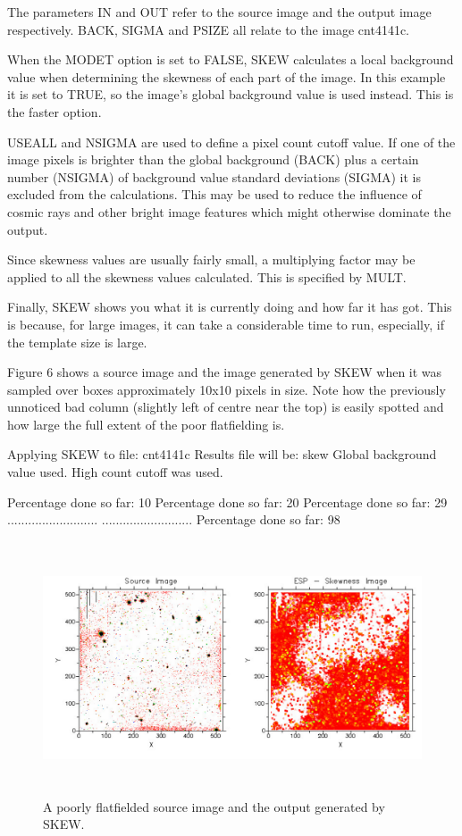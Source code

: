 \documentclass[twoside,11pt]{starlink}
\begin{document}
The parameters IN and OUT refer to the source image and the output image
respectively. BACK, SIGMA and PSIZE all relate to the image
cnt4141c.

When the MODET option is set to FALSE, SKEW calculates a local background
value when determining the skewness of each part of the image. In this
example it is set to TRUE, so the image's global background value is used
instead. This is the faster option.

USEALL and NSIGMA are used to define a pixel count cutoff value. If one of the
image pixels is brighter than the global background (BACK) plus a certain
number (NSIGMA) of background value standard deviations (SIGMA) it is excluded from the
calculations. This may be used to reduce the influence of cosmic rays and
other bright image features which might otherwise dominate the output.

Since skewness values are usually fairly small, a multiplying factor may be
applied to all the skewness values calculated. This is specified by MULT.

Finally, SKEW shows you what it is currently doing and how
far it has got. This is because, for large images, it can
take a considerable time to run, especially, if the template size is large.

Figure 6 shows a source image and the image generated by SKEW when it was sampled
over boxes approximately 10x10 pixels in size. Note how the previously
unnoticed bad column (slightly left of centre near the top) is easily spotted
and how large the full extent of the poor flatfielding is.

\begin{terminalv}
Applying SKEW to file: cnt4141c
Results file will be:  skew
Global background value used.
High count cutoff was used.

Percentage done so far: 10
Percentage done so far: 20
Percentage done so far: 29
..........................
..........................
Percentage done so far: 98
\end{terminalv}

\begin{figure}[htlb]
\centering
\includegraphics[height=75mm,width=150mm]{sun180_diag6}
\caption{A poorly flatfielded source image and the output generated by SKEW.}
\end{figure}
\end{document}
